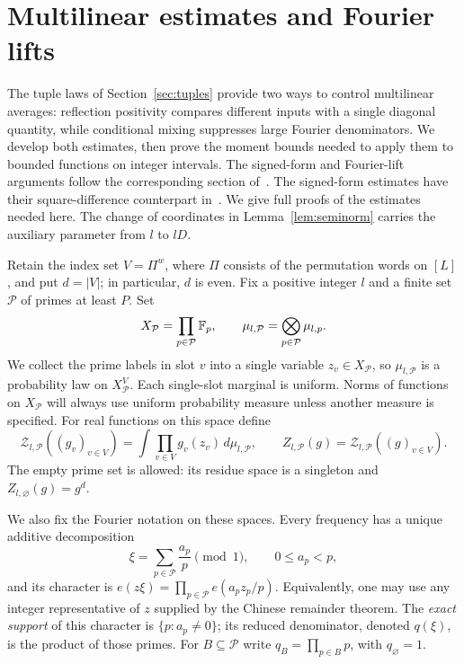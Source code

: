\section{Multilinear estimates and Fourier lifts}
\label{sec:lifts}

The tuple laws of Section~\ref{sec:tuples} provide two ways to control
multilinear averages: reflection positivity compares different inputs
with a single diagonal quantity, while conditional mixing suppresses
large Fourier denominators.  We develop both estimates, then prove the
moment bounds needed to apply them to bounded functions on integer
intervals.  The signed-form and Fourier-lift arguments follow the corresponding
section of~\cite{IntersectivePower}.  The signed-form estimates have their
square-difference counterpart in~\cite[Proposition~4.1 and
Lemmas~4.2--4.3]{SquarePower}.  We give full proofs of the estimates
needed here.  The
change of coordinates in Lemma~\ref{lem:seminorm} carries the auxiliary
parameter from \(l\) to \(lD\).

Retain the index set \(V=\Pi^w\), where \(\Pi\) consists of the
permutation words on \([L]\), and put \(d=|V|\); in particular, \(d\) is even.
Fix a positive integer
\(l\) and a finite set \(\mathcal P\) of primes at least \(P\).  Set
\[
 X_{\mathcal P}=\prod_{p\in\mathcal P}\mathbb F_p,
 \qquad
 \mu_{l,\mathcal P}=\bigotimes_{p\in\mathcal P}\mu_{l,p}.
\]
We collect the prime labels in slot \(v\) into a single variable
\(z_v\in X_{\mathcal P}\), so \(\mu_{l,\mathcal P}\) is a probability
law on \(X_{\mathcal P}^V\).  Each single-slot marginal is uniform.
Norms of functions on \(X_{\mathcal P}\) will always use uniform
probability measure unless another measure is specified.
For real functions on this space define
\[
 \mathcal Z_{l,\mathcal P}((g_v)_{v\in V})
 =\int\prod_{v\in V}g_v(z_v)\,d\mu_{l,\mathcal P},
 \qquad
 Z_{l,\mathcal P}(g)=\mathcal Z_{l,\mathcal P}((g)_{v\in V}).
\]
The empty prime set is allowed: its residue space is a singleton and
\(Z_{l,\varnothing}(g)=g^d\).

We also fix the Fourier notation on these spaces.  Every frequency has a
unique additive decomposition
\[
 \xi=\sum_{p\in\mathcal P}\frac{a_p}{p}\pmod 1,
 \qquad 0\le a_p<p,
\]
and its character is
\(e(z\xi)=\prod_{p\in\mathcal P}e(a_pz_p/p)\).
Equivalently, one may use any integer representative of \(z\) supplied
by the Chinese remainder theorem.  The \emph{exact support} of this
character is \(\{p:a_p\ne0\}\); its reduced denominator, denoted
\(q(\xi)\), is the product of those primes.  For
\(B\subseteq\mathcal P\) write
\(q_B=\prod_{p\in B}p\), with \(q_\varnothing=1\).

